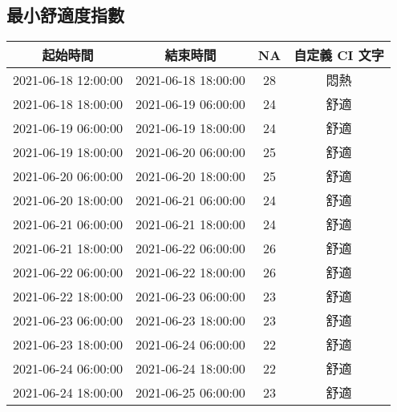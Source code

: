 \documentclass{article}%
\begin{document}
\begin{center}
\section{最小舒適度指數}%
\label{sec:}%
\begin{tabular}{|c|c|c|c|}%
\hline%
起始時間&結束時間&NA&自定義 CI 文字\\%
\hline%
2021{-}06{-}18 12:00:00&2021{-}06{-}18 18:00:00&28&悶熱\\%
\hline%
2021{-}06{-}18 18:00:00&2021{-}06{-}19 06:00:00&24&舒適\\%
\hline%
2021{-}06{-}19 06:00:00&2021{-}06{-}19 18:00:00&24&舒適\\%
\hline%
2021{-}06{-}19 18:00:00&2021{-}06{-}20 06:00:00&25&舒適\\%
\hline%
2021{-}06{-}20 06:00:00&2021{-}06{-}20 18:00:00&25&舒適\\%
\hline%
2021{-}06{-}20 18:00:00&2021{-}06{-}21 06:00:00&24&舒適\\%
\hline%
2021{-}06{-}21 06:00:00&2021{-}06{-}21 18:00:00&24&舒適\\%
\hline%
2021{-}06{-}21 18:00:00&2021{-}06{-}22 06:00:00&26&舒適\\%
\hline%
2021{-}06{-}22 06:00:00&2021{-}06{-}22 18:00:00&26&舒適\\%
\hline%
2021{-}06{-}22 18:00:00&2021{-}06{-}23 06:00:00&23&舒適\\%
\hline%
2021{-}06{-}23 06:00:00&2021{-}06{-}23 18:00:00&23&舒適\\%
\hline%
2021{-}06{-}23 18:00:00&2021{-}06{-}24 06:00:00&22&舒適\\%
\hline%
2021{-}06{-}24 06:00:00&2021{-}06{-}24 18:00:00&22&舒適\\%
\hline%
2021{-}06{-}24 18:00:00&2021{-}06{-}25 06:00:00&23&舒適\\%
\hline%
\end{tabular}

%

\end{center}
\end{document}
